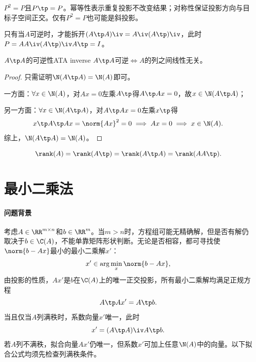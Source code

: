 \begin{corollary}
	$P^2=P$且$P\tp=P$。幂等性表示重复投影不改变结果；对称性保证投影方向与目标子空间正交。仅有$P^2=P$也可能是斜投影。
\end{corollary}

\begin{remark}
	只有当$A$可逆时，才能拆开$(A\tp A)\iv=A\iv(A\tp)\iv$，此时$P=AA\iv(A\tp)\iv A\tp=I$。
\end{remark}

\begin{theorem}{$A\tp A$的可逆性}{ATA inverse}
	$A\tp A$可逆$\iff A$的列之间线性无关。
\end{theorem}
\begin{proof}
	只需证明$\N(A\tp A)=\N(A)$即可。
	
	一方面：$\forall x\in\N(A)$，对$Ax=0$左乘$A\tp$得$A\tp Ax=0$，故$x\in\N(A\tp A)$；
	
	另一方面：$\forall x\in\N(A\tp A)$，对$A\tp Ax=0$左乘$x\tp$得
	\[
		x\tp A\tp Ax=\norm{Ax}^2=0\implies Ax=0\implies x\in\N(A).
	\]
	综上，$\N(A\tp A)=\N(A)$。
\end{proof}
\begin{corollary}
	\[
		\rank(A)=\rank(A\tp)=\rank(A\tp A)=\rank(AA\tp).
	\]
\end{corollary}

\section{最小二乘法}

\paragraph{问题背景}
考虑$A\in\RR^{m\times n}$和$b\in\RR^m$。当$m>n$时，方程组可能无精确解，但是否有解仍取决于$b\in\C(A)$，不能单靠矩阵形状判断。无论是否相容，都可寻找使$\norm{b-Ax}$最小的最小二乘解$x'$：
\[
	x'\in\arg\min_x\norm{b-Ax},
\]
由投影的性质，$Ax'$是$b$在$\C(A)$上的唯一正交投影，所有最小二乘解均满足正规方程
\[
 A\tp Ax'=A\tp b.
\]
当且仅当$A$列满秩时，系数向量$x'$唯一，此时
\begin{equation}
	x'=(A\tp A)\iv A\tp b.
\end{equation}
若$A$列不满秩，拟合向量$Ax'$仍唯一，但系数$x'$可加上任意$\N(A)$中的向量。以下拟合公式均须先检查列满秩条件。


